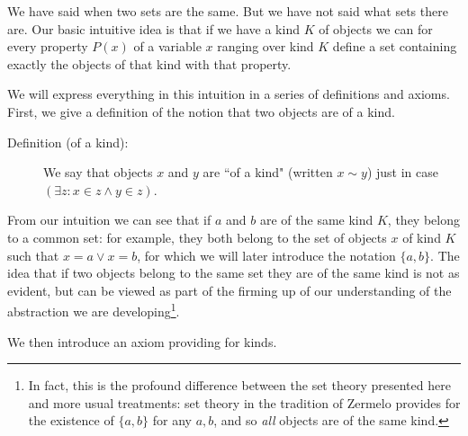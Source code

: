 \documentclass[12pt]{article}
\begin{document}
We have said when two sets are the same.  But we have not said what sets there are.   Our basic intuitive idea is that if we have a kind $K$ of objects
we can for every property $P(x)$ of a variable $x$ ranging over kind $K$ define a set containing exactly the objects of that kind with that property.

We will express everything in this intuition in a series of definitions and axioms.  First, we give a definition of the notion that two objects are of a kind.

\begin{description}

\item[Definition (of a kind):]  We say that objects $x$ and $y$ are ``of a kind" (written $x \sim y$) just in case $(\exists z:x \in z \wedge y \in z)$.

\end{description}

From our intuition we can see that if $a$ and $b$ are of the same kind $K$, they belong to a common set:  for example, they both belong to the set of objects $x$ of kind $K$ such that $x=a \vee x=b$, for which we will later introduce the notation $\{a,b\}$.  The idea that if two objects belong to the same set they are of the same kind is not as evident, but can be viewed as part of the firming up of our understanding of the abstraction we are developing\footnote{In fact, this is the profound difference between the set theory presented here and more usual treatments:  set theory in the tradition of Zermelo provides for the existence of $\{a,b\}$ for any $a,b$, and so {\em all\/} objects are of the same kind.}.

We then introduce an axiom providing for kinds.
\end{document}
